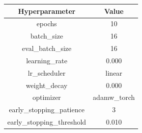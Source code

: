 \begin{tabular}{|c||c|}
\toprule
Hyperparameter & Value \\ \midrule
\midrule
epochs & 10 \\ \midrule
batch\_size & 16 \\ \midrule
eval\_batch\_size & 16 \\ \midrule
learning\_rate & 0.000 \\ \midrule
lr\_scheduler & linear \\ \midrule
weight\_decay & 0.000 \\ \midrule
optimizer & adamw\_torch \\ \midrule
early\_stopping\_patience & 3 \\ \midrule
early\_stopping\_threshold & 0.010 \\ \midrule
\bottomrule
\end{tabular}
